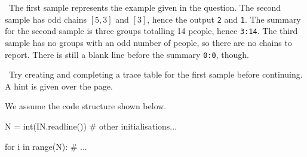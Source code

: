 
\Explanation\ The first sample represents the example given in the question. The second
sample has odd chains $[5,3]$ and $[3]$, hence the output \texttt{2} and \texttt{1}. The
summary for the second sample is three groups totalling 14 people, hence \texttt{3:14}.
The third sample has no groups with an odd number of people, so there are no chains to
report. There is still a blank line before the summary \texttt{0:0}, though.

\Scratch\ Try creating and completing a trace table for the first sample before
continuing. A hint is given over the page.

\clearpage %

We assume the code structure shown below.
\begin{pythoncode}
  N = int(IN.readline())
  # other initialisations...

  for i in range(N):
    # ...
\end{pythoncode}

